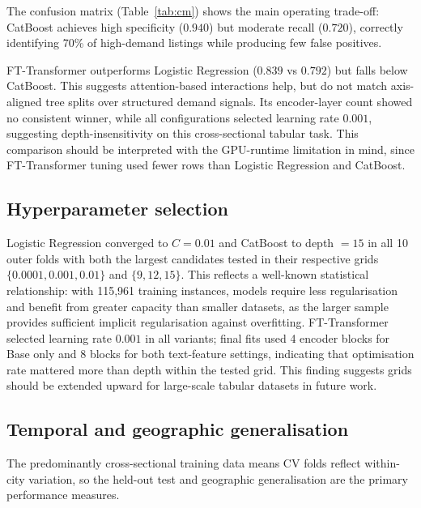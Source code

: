 \documentclass[10pt,a4paper]{article}
\begin{document}
The confusion matrix (Table~\ref{tab:cm}) shows the main operating trade-off:
CatBoost achieves high specificity ($0.940$) but moderate recall ($0.720$),
correctly identifying 70\% of high-demand listings while producing few false
positives.

FT-Transformer outperforms Logistic Regression ($0.839$ vs $0.792$) but falls
below CatBoost. This suggests attention-based interactions help, but do not match
axis-aligned tree splits over structured demand signals. Its encoder-layer count
showed no consistent winner, while all configurations selected learning rate
$0.001$, suggesting depth-insensitivity on this cross-sectional tabular task.
This comparison should be interpreted with the GPU-runtime limitation in mind,
since FT-Transformer tuning used fewer rows than Logistic Regression and CatBoost.

\subsection{Hyperparameter selection}
Logistic Regression converged to $C = 0.01$ and CatBoost to depth $= 15$ in all
10 outer folds with both the largest candidates tested in their respective grids
$\{0.0001, 0.001, 0.01\}$ and $\{9, 12, 15\}$. This reflects a well-known
statistical relationship: with 115{,}961 training instances, models require less
regularisation and benefit from greater capacity than smaller datasets, as the
larger sample provides sufficient implicit regularisation against overfitting.
 FT-Transformer selected learning rate $0.001$ in all
variants; final fits used 4 encoder blocks for Base only and 8 blocks for both
text-feature settings, indicating that optimisation rate mattered more than depth
within the tested grid.
This finding suggests grids should be extended upward for large-scale tabular
datasets in future work.

\subsection{Temporal and geographic generalisation}
The predominantly cross-sectional training data means CV folds reflect within-city
variation, so the held-out test and geographic generalisation are the primary
performance measures.
\end{document}
